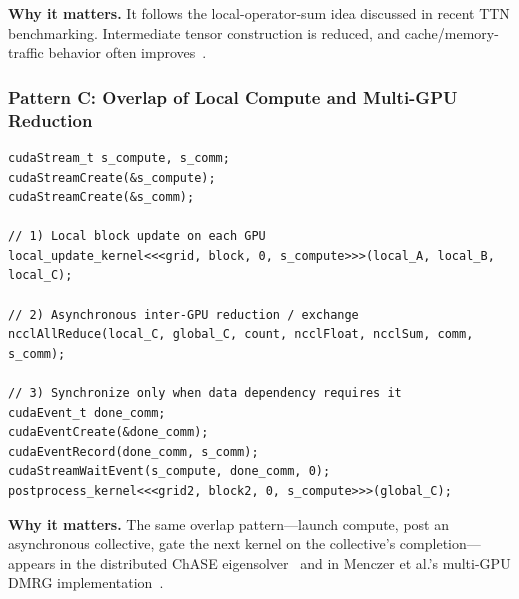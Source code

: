 \textbf{Why it matters.}
It follows the local-operator-sum idea discussed in recent TTN benchmarking.
Intermediate tensor construction is reduced, and cache/memory-traffic behavior
often improves~\cite{krinitsin2025ttn-ed}.

\subsubsection{Pattern C: Overlap of Local Compute and Multi-GPU Reduction}

\begin{lstlisting}[language=CUDA, caption={Two-stream overlap pattern for distributed dense kernels. The communication stream runs asynchronous collectives while compute proceeds on the main stream.}, label={lst:sota-overlap}]
cudaStream_t s_compute, s_comm;
cudaStreamCreate(&s_compute);
cudaStreamCreate(&s_comm);

// 1) Local block update on each GPU
local_update_kernel<<<grid, block, 0, s_compute>>>(local_A, local_B, local_C);

// 2) Asynchronous inter-GPU reduction / exchange
ncclAllReduce(local_C, global_C, count, ncclFloat, ncclSum, comm, s_comm);

// 3) Synchronize only when data dependency requires it
cudaEvent_t done_comm;
cudaEventCreate(&done_comm);
cudaEventRecord(done_comm, s_comm);
cudaStreamWaitEvent(s_compute, done_comm, 0);
postprocess_kernel<<<grid2, block2, 0, s_compute>>>(global_C);
\end{lstlisting}

\textbf{Why it matters.}
The same overlap pattern---launch compute, post an asynchronous collective,
gate the next kernel on the collective's completion---appears in the
distributed ChASE eigensolver~\cite{wu2022chase-gpu,wu2023chase-nccl} and
in Menczer et al.'s multi-GPU DMRG
implementation~\cite{menczer2025massive-jctc}.
